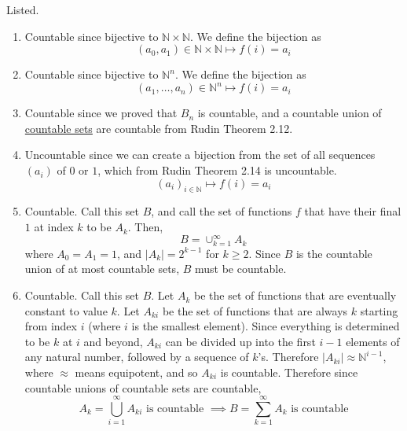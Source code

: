   \begin{solution}
    Listed. 
    \begin{enumerate}
      \item Countable since bijective to $\mathbb{N} \times \mathbb{N}$. We define the bijection as 
      \begin{equation}
        (a_0, a_1) \in \mathbb{N} \times \mathbb{N} \mapsto f(i) = a_i 
      \end{equation}

      \item Countable since bijective to $\mathbb{N}^n$. We define the bijection as 
      \begin{equation}
        (a_1, \ldots, a_n) \in \mathbb{N}^n \mapsto f(i) = a_i
      \end{equation}

      \item Countable since we proved that $B_n$ is countable, and a countable union of \hyperref[st-def:countable]{countable sets} are countable from Rudin Theorem 2.12. 

      \item Uncountable since we can create a bijection from the set of all sequences $(a_i)$ of $0$ or $1$, which from Rudin Theorem 2.14 is uncountable. 
      \begin{equation}
        (a_i)_{i \in \mathbb{N}} \mapsto f(i) = a_i
      \end{equation}

      \item Countable. Call this set $B$, and call the set of functions $f$ that have their final $1$ at index $k$ to be $A_k$. Then, 
      \begin{equation}
        B = \cup_{k=1}^\infty A_k 
      \end{equation}
      where $A_0 = A_1 = 1$, and $|A_k| = 2^{k-1}$ for $k \geq 2$. Since $B$ is the countable union of at most countable sets, $B$ must be countable. 

      \item Countable. Call this set $B$. Let $A_k$ be the set of functions that are eventually constant to value $k$. Let $A_{ki}$ be the set of functions that are always $k$ starting from index $i$ (where $i$ is the smallest element). Since everything is determined to be $k$ at $i$ and beyond, $A_{ki}$ can be divided up into the first $i-1$ elements of any natural number, followed by a sequence of $k$'s. Therefore $|A_{ki}| \approx \mathbb{N}^{i-1}$, where $\approx$ means equipotent, and so $A_{ki}$ is countable. Therefore since countable unions of countable sets are countable, 
      \begin{equation}
        A_k = \bigcup_{i=1}^\infty A_{ki} \text{ is countable } \implies B = \sum_{k=1}^\infty A_k \text{ is countable}
      \end{equation}
    \end{enumerate}
  \end{solution}

